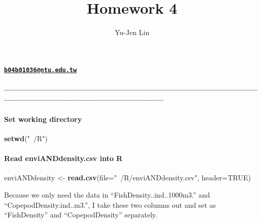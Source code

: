 \documentclass[]{article}
\title{Homework 4}
\author{Yu-Jen Lin}
\date{}
\newenvironment{Shaded}{\begin{snugshade}}{\end{snugshade}}
\newcommand{\KeywordTok}[1]{\textcolor[rgb]{0.13,0.29,0.53}{\textbf{{#1}}}}
\newcommand{\DataTypeTok}[1]{\textcolor[rgb]{0.13,0.29,0.53}{{#1}}}
\newcommand{\StringTok}[1]{\textcolor[rgb]{0.31,0.60,0.02}{{#1}}}
\newcommand{\OtherTok}[1]{\textcolor[rgb]{0.56,0.35,0.01}{{#1}}}
\newcommand{\NormalTok}[1]{{#1}}
\let\oldparagraph\paragraph
\renewcommand{\paragraph}[1]{\oldparagraph{#1}\mbox{}}
\begin{document}
\maketitle

\paragraph{\texorpdfstring{\href{mailto:b04b01036@ntu.edu.tw}{\nolinkurl{b04b01036@ntu.edu.tw}}}{b04b01036@ntu.edu.tw}}\label{b04b01036ntu.edu.tw}

\paragraph{--------------------------------------------------------------------------------------------------------------------------------------------------------}\label{section}

\paragraph{Set working directory}\label{set-working-directory}

\begin{Shaded}
\begin{Highlighting}[]
\KeywordTok{setwd}\NormalTok{(}\StringTok{"~/R"}\NormalTok{)}
\end{Highlighting}
\end{Shaded}

\paragraph{Read enviANDdensity.csv into
R}\label{read-envianddensity.csv-into-r}

\begin{Shaded}
\begin{Highlighting}[]
\NormalTok{enviANDdensity <-}\StringTok{ }\KeywordTok{read.csv}\NormalTok{(}\DataTypeTok{file=}\StringTok{"~/R/enviANDdensity.csv"}\NormalTok{, }\DataTypeTok{header=}\OtherTok{TRUE}\NormalTok{)}
\end{Highlighting}
\end{Shaded}

Because we only need the data in ``FishDensity..ind..1000m3.'' and
``CopepodDensity.ind..m3.'', I take these two columns out and set as
``FishDensity'' and ``CopepodDensity'' separately.

\begin{Shaded}
\end{Shaded}
\end{document}
